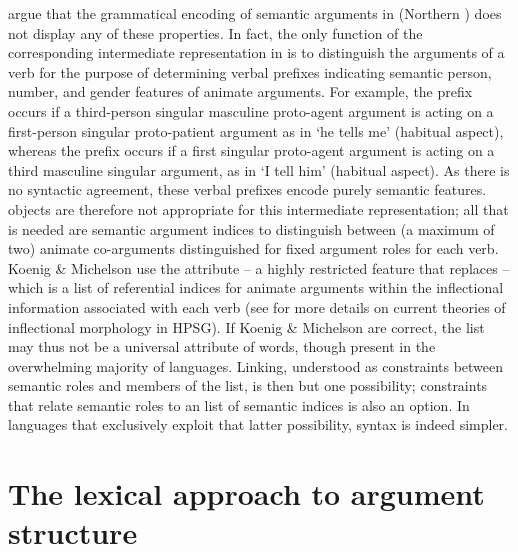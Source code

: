 \documentclass[output=paper,biblatex,babelshorthands,newtxmath,draftmode,colorlinks, citecolor=brown]{langscibook}
\begin{document}
\noindent
\citet{KoenigandMichelson2014,KoenigandMichelson2015a,KoenigandMichelson2015b} argue that the grammatical encoding of semantic arguments in  (Northern )  does not display any of these properties.  In fact, the only function of the
corresponding intermediate representation in  is to distinguish
the arguments of a verb for the purpose of determining verbal
prefixes indicating semantic person, number, and gender
features of animate arguments.  
For example,  the prefix  occurs if a third-person singular masculine proto-agent argument is acting on a first-person singular proto-patient argument as in   `he tells me’ (habitual aspect), whereas  the prefix  occurs if a first singular proto-agent argument is acting on a third masculine singular argument, as in  `I tell him’ (habitual aspect).
 As there is no syntactic agreement, these verbal prefixes encode purely semantic features.
 objects are therefore not appropriate for this intermediate
representation; all that is needed are semantic argument indices to
distinguish between (a maximum of two) animate co-arguments
distinguished for fixed argument roles for each verb.
Koenig \& Michelson use the attribute  -- a highly restricted
 feature that replaces \argst --  which is a list of referential indices for animate arguments within the inflectional information associated with each verb (see  for more details on current theories of inflectional morphology in HPSG).
 If Koenig \& Michelson are correct, the \argst list may thus not be a universal attribute of words, though present in the overwhelming majority of languages.
Linking, understood as constraints between semantic roles and members of the \argst list, is then but one possibility; constraints that relate semantic roles to an  list of semantic indices is also an option.
In languages that exclusively exploit that latter possibility, syntax is indeed simpler.



\section{The lexical approach to argument structure}
\label{lexicalapproach}
\end{document}
